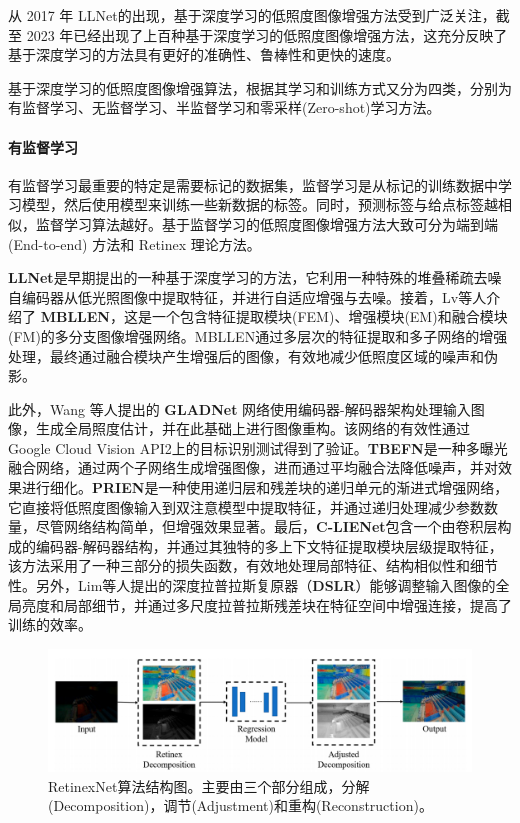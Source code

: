 \documentclass[a4paper]{ctexart}
\begin{document}
	从 2017 年 LLNet\cite{lore2017llnet}的出现，基于深度学习的低照度图像增强方法受到广泛关注，截至 2023 年已经出现了上百种基于深度学习的低照度图像增强方法，这充分反映了基于深度学习的方法具有更好的准确性、鲁棒性和更快的速度。
	
	基于深度学习的低照度图像增强算法，根据其学习和训练方式又分为四类，分别为有监督学习、无监督学习、半监督学习和零采样(Zero-shot)学习方法\cite{tang2023low}。
	
	\paragraph{有监督学习}
	
	有监督学习最重要的特定是需要标记的数据集，监督学习是从标记的训练数据中学习模型，然后使用模型来训练一些新数据的标签。同时，预测标签与给点标签越相似，监督学习算法越好。基于监督学习的低照度图像增强方法大致可分为端到端 (End-to-end) 方法和 Retinex 理论方法。
	
	\textbf{LLNet}\cite{lore2017llnet}是早期提出的一种基于深度学习的方法，它利用一种特殊的堆叠稀疏去噪自编码器从低光照图像中提取特征，并进行自适应增强与去噪。接着，Lv等人\cite{lv2018mbllen}介绍了 \textbf{MBLLEN}，这是一个包含特征提取模块(FEM)、增强模块(EM)和融合模块(FM)的多分支图像增强网络。MBLLEN通过多层次的特征提取和多子网络的增强处理，最终通过融合模块产生增强后的图像，有效地减少低照度区域的噪声和伪影。
	
	此外，Wang 等人\cite{wang2018gladnet}提出的 \textbf{GLADNet} 网络使用编码器-解码器架构处理输入图像，生成全局照度估计，并在此基础上进行图像重构。该网络的有效性通过Google Cloud Vision API2上的目标识别测试得到了验证。\textbf{TBEFN}\cite{lu2020tbefn}是一种多曝光融合网络，通过两个子网络生成增强图像，进而通过平均融合法降低噪声，并对效果进行细化。\textbf{PRIEN}\cite{li2021low}是一种使用递归层和残差块的递归单元的渐进式增强网络，它直接将低照度图像输入到双注意模型中提取特征，并通过递归处理减少参数数量，尽管网络结构简单，但增强效果显著。最后，\textbf{C-LIENet}\cite{ravirathinam2021c}包含一个由卷积层构成的编码器-解码器结构，并通过其独特的多上下文特征提取模块层级提取特征，该方法采用了一种三部分的损失函数，有效地处理局部特征、结构相似性和细节性。另外，Lim等人\cite{lim2020dslr}提出的深度拉普拉斯复原器（\textbf{DSLR}）能够调整输入图像的全局亮度和局部细节，并通过多尺度拉普拉斯残差块在特征空间中增强连接，提高了训练的效率。
	
	\begin{figure}[htb]
		\centering 
		\includegraphics[width=0.7\columnwidth]{picture/LLIE/RetinexNet/RetinexNet}
		\caption{
			\label{fig: RetinexNet} 
			RetinexNet算法结构图。主要由三个部分组成，分解(Decomposition)，调节(Adjustment)和重构(Reconstruction)。
		}
	\end{figure}
	
\end{document}
